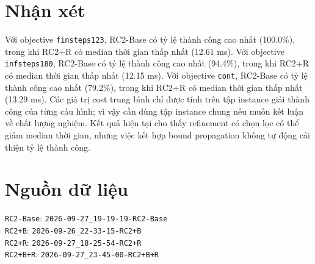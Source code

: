 \documentclass[11pt,a4paper]{article}
\begin{document}
\section{Nhận xét}
Với objective \texttt{finsteps123}, RC2-Base có tỷ lệ thành công cao nhất (100.0\%), trong khi RC2+R có median thời gian thấp nhất (12.61 ms).
Với objective \texttt{infsteps180}, RC2-Base có tỷ lệ thành công cao nhất (94.4\%), trong khi RC2+R có median thời gian thấp nhất (12.15 ms).
Với objective \texttt{cont}, RC2-Base có tỷ lệ thành công cao nhất (79.2\%), trong khi RC2+R có median thời gian thấp nhất (13.29 ms).
Các giá trị cost trung bình chỉ được tính trên tập instance giải thành công của từng cấu hình; vì vậy cần dùng tập instance chung nếu muốn kết luận về chất lượng nghiệm. Kết quả hiện tại cho thấy refinement có chọn lọc có thể giảm median thời gian, nhưng việc kết hợp bound propagation không tự động cải thiện tỷ lệ thành công.
\section{Nguồn dữ liệu}
\texttt{RC2-Base}: \texttt{2026-09-27\_19-19-19-RC2-Base}\\
\texttt{RC2+B}: \texttt{2026-09-26\_22-33-15-RC2+B}\\
\texttt{RC2+R}: \texttt{2026-09-27\_18-25-54-RC2+R}\\
\texttt{RC2+B+R}: \texttt{2026-09-27\_23-45-00-RC2+B+R}\\
\end{document}
